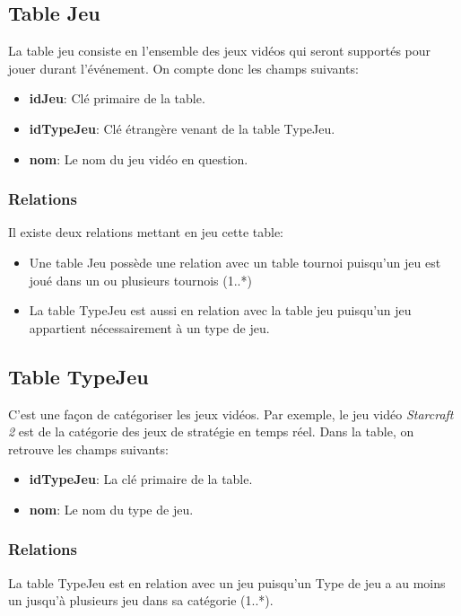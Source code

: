 \documentclass[11pt,french]{article}
\begin{document}
        \subsection{Table Jeu} %
        \label{sub:table-jeu}
            La table jeu consiste en l'ensemble des jeux vidéos qui seront supportés pour jouer durant l'événement. On compte donc les champs
            suivants:
            \begin{itemize}
                \item {\bf idJeu}: Clé primaire de la table.
                \item {\bf idTypeJeu}: Clé étrangère venant de la table TypeJeu.
                \item {\bf nom}: Le nom du jeu vidéo en question.
            \end{itemize}
            \subsubsection{Relations} %
            \label{ssub:relations-jeu}
                Il existe deux relations mettant en jeu cette table:
                \begin{itemize}
                    \item Une table Jeu possède une relation avec un table tournoi puisqu'un jeu est joué dans un ou plusieurs tournois (1..*)
                    \item La table TypeJeu est aussi en relation avec la table jeu puisqu'un jeu appartient nécessairement à un type de jeu.
                \end{itemize}
        \subsection{Table TypeJeu} %
        \label{sub:table-type-jeu}
            C'est une façon de catégoriser les jeux vidéos. Par exemple, le jeu vidéo {\it Starcraft 2} 
            est de la catégorie des jeux de stratégie en temps réel. Dans la table, on retrouve les champs suivants:
            \begin{itemize}
                \item {\bf idTypeJeu}: La clé primaire de la table.
                \item {\bf nom}: Le nom du type de jeu.
            \end{itemize}
            \subsubsection{Relations} %
            \label{ssub:relations-type-jeu}
                La table TypeJeu est en relation avec un jeu puisqu'un Type de jeu a au moins un jusqu'à plusieurs jeu dans sa catégorie (1..*).
    \newpage
\end{document}
